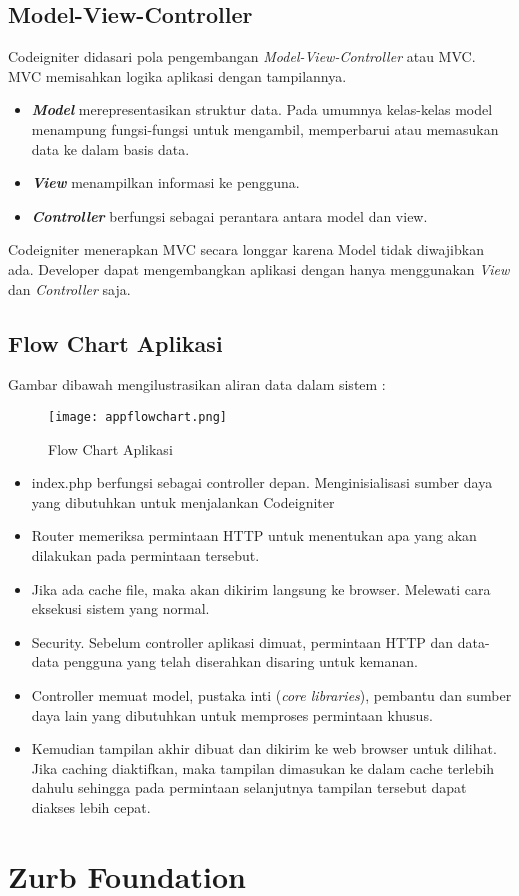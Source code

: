 \subsection{Model-View-Controller}
Codeigniter didasari pola pengembangan \textit{Model-View-Controller} atau MVC. MVC memisahkan logika aplikasi dengan tampilannya.
\begin{itemize}
		\item \textbf{\textit{Model}} merepresentasikan struktur data. Pada umumnya kelas-kelas model menampung fungsi-fungsi untuk mengambil, memperbarui atau memasukan data ke dalam basis data.
		\item \textbf{\textit{View}} menampilkan informasi ke pengguna. 
		\item \textbf{\textit{Controller}} berfungsi sebagai perantara antara model dan view.
	\end{itemize}
Codeigniter menerapkan MVC secara longgar karena Model tidak diwajibkan ada. Developer dapat mengembangkan aplikasi dengan hanya menggunakan \textit{View} dan \textit{Controller} saja.

\subsection{Flow Chart Aplikasi}
Gambar dibawah mengilustrasikan aliran data dalam sistem :
\begin{figure} [ht]
	\centering  
	\texttt{[image: appflowchart.png]}  
	\caption[Flow Chart Aplikasi]{Flow Chart Aplikasi} 
	\label{fig:template-jadwal-dosen} 
\end{figure}
\begin{itemize}
		\item index.php berfungsi sebagai controller depan. Menginisialisasi sumber daya yang dibutuhkan untuk menjalankan Codeigniter
		\item Router memeriksa permintaan HTTP untuk menentukan apa yang akan dilakukan pada permintaan tersebut.
		\item Jika ada cache file, maka akan dikirim langsung ke browser. Melewati cara eksekusi sistem yang normal.
		\item Security. Sebelum controller aplikasi dimuat, permintaan HTTP dan data-data pengguna yang telah diserahkan disaring untuk kemanan.
		\item Controller memuat model, pustaka inti (\textit{core libraries}), pembantu dan sumber daya lain yang dibutuhkan untuk memproses permintaan khusus.
		\item Kemudian tampilan akhir dibuat dan dikirim ke web browser untuk dilihat. Jika caching diaktifkan, maka tampilan dimasukan ke dalam cache terlebih dahulu sehingga pada permintaan selanjutnya tampilan tersebut dapat diakses lebih cepat.
	\end{itemize}
	

\section{Zurb Foundation}
\label{zurbfoundation}

\paragraph{}  